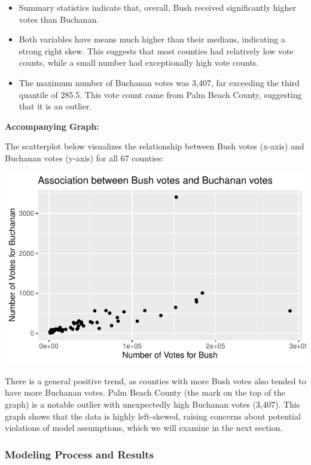 \documentclass[
  letterpaper,
  DIV=11,
  numbers=noendperiod]{scrartcl}
\begin{document}
\begin{itemize}
\item
  Summary statistics indicate that, overall, Bush received significantly
  higher votes than Buchanan.
\item
  Both variables have means much higher than their medians, indicating a
  strong right skew. This suggests that most counties had relatively low
  vote counts, while a small number had exceptionally high vote counts.
\item
  The maximum number of Buchanan votes was 3,407, far exceeding the
  third quantile of 285.5. This vote count came from Palm Beach County,
  suggesting that it is an outlier.
\end{itemize}

\textbf{Accompanying Graph:}

The scatterplot below visualizes the relationship between Bush votes
(x-axis) and Buchanan votes (y-axis) for all 67 counties:

\includegraphics{SDS-291-case-study-1_files/figure-pdf/unnamed-chunk-3-1.pdf}

There is a general positive trend, as counties with more Bush votes also
tended to have more Buchanan votes. Palm Beach County (the mark on the
top of the graph) is a notable outlier with unexpectedly high Buchanan
votes (3,407). This graph shows that the data is highly left-skewed,
raising concerns about potential violations of model assumptions, which
we will examine in the next section.

\subsubsection{Modeling Process and
Results}\label{modeling-process-and-results}
\end{document}
